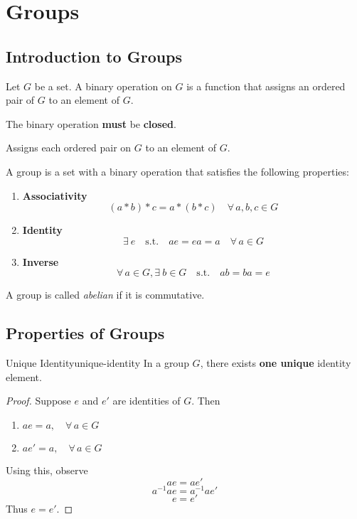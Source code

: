 \documentclass{report}
\let\oldforall\forall
\renewcommand{\forall}{\oldforall \, }
\let\oldexist\exists
\renewcommand{\exists}{\oldexist \: }
\newcommand{\st}{\quad \mathrm{s.t.} \quad}
\begin{document}
\tableofcontents

\chapter{Groups}
\section{Introduction to Groups}

\begin{definition}[title={Binary Operation}]
Let $G$ be a set. A binary operation on $G$ is a function that 
assigns an ordered pair of $G$ to an element of $G$.

The binary operation \textbf{must} be \textbf{closed}.

Assigns each ordered pair on $G$ to an element of $G$.
\end{definition}

\begin{definition}[title={Group}]
A group is a set with a binary operation that satisfies the following properties:

\begin{enumerate}
  \item \textbf{Associativity}
  \[ (a * b) * c = a * (b * c) \quad \forall a, b, c \in G \]
  \item \textbf{Identity}
  \[ \exists e \st ae = ea = a \quad \forall a \in G \]
  \item \textbf{Inverse}
  \[ \forall a \in G, \exists b \in G \st ab = ba = e\]
\end{enumerate}
\end{definition}

\begin{note}
A group is called \textit{abelian} if it is commutative.
\end{note}

\section{Properties of Groups}

\begin{theo}{Unique Identity}{unique-identity}
In a group $G$, there exists \textbf{one unique} identity element.
\end{theo}

\begin{proof}
Suppose $e$ and $e'$ are identities of $G$. Then
\begin{enumerate}
  \item $ae = a, \quad \forall a \in G$
  \item $ae' = a, \quad \forall a \in G$
\end{enumerate}
Using this, observe
\[ ae = ae' \]
\[ a^{-1}ae = a^{-1}ae' \]
\[ e = e' \]
Thus $e = e'$.
\end{proof}
\end{document}
